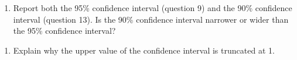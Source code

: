 \documentclass[
]{report}
\providecommand{\tightlist}{%
  \setlength{\itemsep}{0pt}\setlength{\parskip}{0pt}}
\begin{document}
\begin{enumerate}
\def\labelenumi{\arabic{enumi}.}
\setcounter{enumi}{13}
\tightlist
\item
  Report both the 95\% confidence interval (question 9) and the 90\% confidence interval (question 13). Is the 90\% confidence interval narrower or wider than the 95\% confidence interval?
\end{enumerate}

\vspace{0.5in}

\begin{enumerate}
\def\labelenumi{\arabic{enumi}.}
\setcounter{enumi}{14}
\tightlist
\item
  Explain why the upper value of the confidence interval is truncated at 1.
\end{enumerate}

\vspace{0.5in}

\newpage

\end{document}
